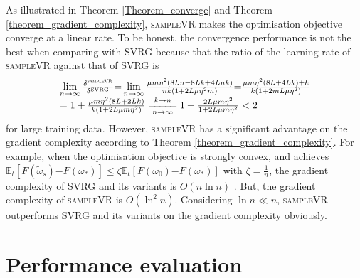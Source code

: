 \documentclass[letterpaper]{article}
\begin{document}
 As illustrated in Theorem \ref{Theorem_converge} and Theorem \ref{theorem_gradient_complexity}, \textsc{sampleVR} makes the optimisation objective converge at a linear rate. To be honest,  the convergence performance is  not the best when comparing with SVRG  because that the ratio of the learning rate of \textsc{sampleVR} against that of \textsc{SVRG} is
\begin{equation}
\begin{array}{ll}
 \lim\limits_{n\to\infty}\frac{\delta^{\mathrm{\textsc{sampleVR}}}}{\delta^{\mathrm{SVRG}}} \mathrm{=} \lim\limits_{n\to\infty}\frac{\mu m\eta^2(8Ln-8Lk+4Lnk)}{nk(1+2L\mu \eta^2 m)}  \mathrm{=} \frac{\mu m \eta^2 (8L+4Lk)+k}{k(1+2mL\mu\eta^2)} \\
 = 1+\frac{\mu m \eta^2 (8L+2Lk)}{k(1+2L\mu m \eta^2)}\xlongequal[n\mathrm{\rightarrow}\infty]{k\mathrm{\rightarrow}n}1+\frac{2L\mu m \eta^2}{1+2L\mu m \eta^2}<2
 \end{array} 
\end{equation} for large training data. However, \textsc{sampleVR} has a significant advantage on the gradient complexity according to Theorem \ref{theorem_gradient_complexity}. For example, when the optimisation objective is strongly convex, and achieves $\mathbb{E}_t[F(\tilde{\omega}_s)\mathrm{-}F(\omega_\ast)] \le \zeta \mathbb{E}_t[F(\omega_0)\mathrm{-}F(\omega_\ast)]$ with $\zeta=\frac{1}{n}$, the gradient complexity of SVRG and its variants is $O\left(n \ln n\right)$ \cite{Allen2015UniVR}. But, the gradient complexity of \textsc{sampleVR}  is $O( \ln^2 n ) $. Considering $\ln n \ll n$, \textsc{sampleVR}  outperforms SVRG and its variants on the gradient complexity obviously.




\section{Performance evaluation}
\label{sect_performance_evaluation}
\end{document}
